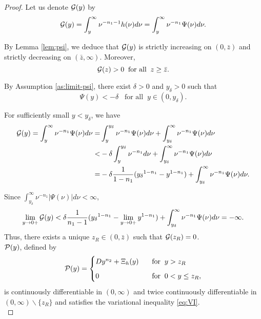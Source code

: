 \documentclass[a4paper,report, 11pt]{article}
\def\d{\delta}
\begin{document}
\begin{proof}
	
	
	
	Let us denote ${\cal G}(y)$ by 
		\begin{align*}
		{\cal G}(y)=\int_{y}^\infty \nu^{-n_1-1}{h}(\nu)d\nu=\int_{y}^\infty \nu^{-n_1}{\Psi}(\nu)d\nu.
		\end{align*}
		
	By Lemma \ref{lem:psi}, we deduce that ${\cal G}(y)$ is strictly increasing on $(0,\bar{z})$ and strictly decreasing on $(\bar{z},\infty)$. Moreover, 
	$$
	{\cal G}(z)>0\;\;\mbox{for all}\;\; z\ge \bar{z}.
	$$
	
	By Assumption \ref{as:limit-psi}, there exist $\d>0$ and $y_\d >0$ such that 
	$$
	\Psi(y)<-\d\;\;\;\mbox{for all}\;\;y\in(0,y_\d). 
	$$
	
	For sufficiently small $y<y_\d$, we have
	\begin{align*}
	{\cal G}(y) = \int_y^\infty \nu^{-n_1}\Psi(\nu)d\nu = &\int_y^{y_\d} \nu^{-n_1}\Psi(\nu)d\nu+\int_{y_\d}^\infty \nu^{-n_1}\Psi(\nu)d\nu\nonumber\\
	<&-\d\int_y^{y_\d}\nu^{-n_1}d\nu +\int_{y_\d}^\infty \nu^{-n_1}\Psi(\nu)d\nu\\
	=&-\d\dfrac{1}{1-n_1}({y_\d}^{1-n_1}-y^{1-n_1})+\int_{y_\d}^\infty \nu^{-n_1}\Psi(\nu)d\nu.\nonumber
	\end{align*}
	
	Since $\displaystyle\int_{y_\d}^\infty \nu^{-n_1}|\Psi(\nu)|d\nu<\infty$, 
	\begin{equation*}
	\lim_{y\to 0+}{\cal G}(y) < \d\dfrac{1}{n_1-1}({y_\d}^{1-n_1}-\lim_{y\to 0+} y^{1-n_1})+\int_{y_\d}^\infty \nu^{-n_1}\Psi(\nu)d\nu =-\infty. 
	\end{equation*}
	Thus, there exists a unique $z_R\in(0,\bar{z})$ such that ${\cal G}(z_R)=0$. \\
	
	 ${\cal P}(y)$, defined by 
	\begin{align*}
	{\cal P}(y)=
	\begin{cases}
	Dy^{n_2} + \Xi_h(y)\;\;\;&\mbox{for}\;\;y>z_R\vspace{2mm}\\
	0\;\;\;&\mbox{for}\;\;0<y\le z_R,
	\end{cases}
	\end{align*} 
	is continuously differentiable in $(0,\infty)$ and twice continuously differentiable in $(0,\infty)\backslash\{z_R\}$ and satisfies the variational inequality \eqref{eq:VI}. \\
	

\end{proof}
\end{document}
